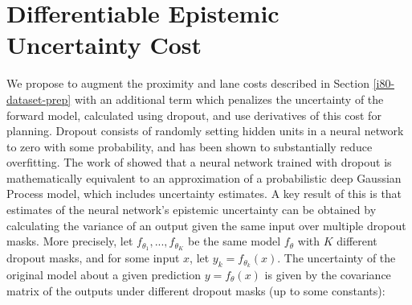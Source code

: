 \documentclass{article} %
\begin{document}




















    \section{Differentiable Epistemic Uncertainty Cost}

    We propose to augment the proximity and lane costs described in Section \ref{i80-dataset-prep} with an additional term which penalizes the uncertainty of the forward model, calculated using dropout, and use derivatives of this cost for planning.
    Dropout \citep{Dropout2012, Dropout2014} consists of randomly setting hidden units in a neural network to zero with some probability, and has been shown to substantially reduce overfitting.
    The work of \citep{Gal16} showed that a neural network trained with dropout is mathematically equivalent to an approximation of a probabilistic deep Gaussian Process model, which includes uncertainty estimates.
    A key result of this is that estimates of the neural network's epistemic uncertainty can be obtained by calculating the variance of an output given the same input over multiple dropout masks.
    More precisely, let $f_{\theta_1}, ..., f_{\theta_K}$ be the same model $f_\theta$ with $K$ different dropout masks, and for some input $x$, let $y_k=f_{\theta_k}(x)$.
    The uncertainty of the original model about a given prediction $y=f_\theta(x)$ is given by the covariance matrix of the outputs under different dropout masks (up to some constants):
\end{document}
